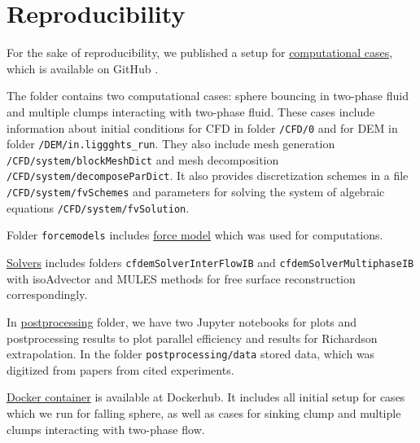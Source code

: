 \appendix
\doublespacing
\chapter{Reproducibility}
For the sake of reproducibility, we published a setup for \href{https://github.com/asarmakeeva/multiphaseIB/tree/master/reproPack/code/cases}{computational cases}, which is available on GitHub \cite{github}. 

The folder contains two computational cases: sphere bouncing in two-phase fluid and multiple clumps interacting with two-phase fluid. These cases include information about initial conditions for CFD in folder \verb|/CFD/0| and for DEM in folder \verb|/DEM/in.liggghts_run|. They also include mesh generation \verb|/CFD/system/blockMeshDict| and mesh decomposition \verb|/CFD/system/decomposeParDict|. It also provides discretization schemes 
in a file \verb|/CFD/system/fvSchemes| and parameters for solving the system of algebraic equations \verb|/CFD/system/fvSolution|.

Folder \verb|forcemodels| includes \href{https://github.com/asarmakeeva/multiphaseIB/tree/master/reproPack/code/forcemodels}{force model} which was used for computations.

\href{https://github.com/asarmakeeva/multiphaseIB/tree/master/reproPack/code/solvers}{Solvers} includes folders \verb|cfdemSolverInterFlowIB| and \verb|cfdemSolverMultiphaseIB| with isoAdvector \cite{roenby2019isoadvector} and MULES \cite{MULES} methods for free surface reconstruction correspondingly.

In \href{https://github.com/asarmakeeva/multiphaseIB/tree/master/reproPack/postprocessing}{postprocessing} folder, we have two Jupyter notebooks for plots and postprocessing results to plot parallel efficiency and results for Richardson extrapolation. In the folder \verb|postprocessing/data| stored data, which was digitized from papers from cited experiments.

\href{https://hub.docker.com/repository/docker/asarmakeeva/cfdem_ib/}{Docker container} is available at Dockerhub. It includes all initial setup for cases which we run for falling sphere, as well as cases for sinking clump and multiple clumps interacting with two-phase flow.
